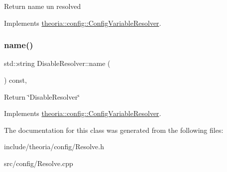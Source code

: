 Return name un resolved 

Implements \hyperlink{classtheoria_1_1config_1_1ConfigVariableResolver}{theoria\+::config\+::\+Config\+Variable\+Resolver}.

\mbox{\label{classtheoria_1_1config_1_1DisableResolver_ae7caa7a59ad2921ec2cba0544ed26ad0}} 
\subsubsection{\texorpdfstring{name()}{name()}}
{\footnotesize\ttfamily std\+::string Disable\+Resolver\+::name (\begin{DoxyParamCaption}{ }\end{DoxyParamCaption}) const\hspace{0.3cm}{\ttfamily [override]}, {\ttfamily [virtual]}}

Return \char`\"{}\+Disable\+Resolver\char`\"{} 

Implements \hyperlink{classtheoria_1_1config_1_1ConfigVariableResolver_a026bda729faf988eaef334a45ec92303}{theoria\+::config\+::\+Config\+Variable\+Resolver}.



The documentation for this class was generated from the following files\+:\begin{DoxyCompactItemize}
\item 
include/theoria/config/Resolve.\+h\item 
src/config/Resolve.\+cpp\end{DoxyCompactItemize}
